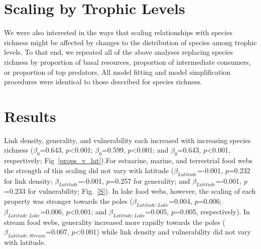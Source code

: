 \documentclass[12pt]{article}
\begin{document}
  \section*{Scaling by Trophic Levels}

    We were also interested in the ways that scaling relationships with species richness might
    be affected by changes to the distribution of species among trophic levels. To
    that end, we repeated all of the above analyses replacing species richness by
    proportion of basal resources, proportion of intermediate consumers,
    or proportion of top predators. All model fitting and model
    simplification procedures were identical to those described for species
    richness.


\section*{Results}

  Link density, generality, and vulnerability each increased with increasing
  species richness ($\beta_0$=0.643, $p$\textless0.001; $\beta_0$=0.599,
  $p$\textless0.001; and $\beta_0$=0.643, $p$\textless0.001, respectively;
  Fig~\ref{props_v_lat}).For estuarine, marine, and terrestrial food webs the
  strength of this scaling did not vary with latitude
  ($\beta_{Latitude}$=-0.001, $p$=0.232 for link density;
  $\beta_{Latitude}$=-0.001, $p$=0.257 for generality; and
  $\beta_{Latitude}$=-0.001, $p$=0.233 for vulnerability; Fig.~\ref{S}). In
  lake food webs, however, the scaling of each property was stronger towards
  the poles ($\beta_{Latitude:Lake}$=0.004, $p$=0.006;
  $\beta_{Latitude:Lake}$=0.006, $p$\textless0.001; and
  $\beta_{Latitude:Lake}$=0.005, $p$=0.005, respectively). In stream food
  webs, generality increased more rapidly towards the poles
  ($\beta_{Latitude:Stream}$=0.007, $p$\textless0.001) while link density and
  vulnerability did not vary with latitude.
\end{document}
